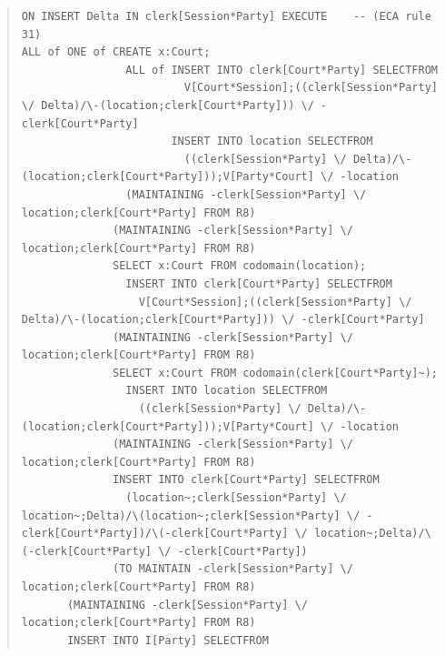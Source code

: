 \documentclass[10pt,a4paper]{report}              %
\theoremstyle{plain}\theorembodyfont{\rmfamily}\newtheorem{definition}{Definition}[section]
\theoremstyle{plain}\theorembodyfont{\rmfamily}\newtheorem{designrule}[definition]{Requirement}
\begin{document}
\begin{quote}
\begin{verbatim}
ON INSERT Delta IN clerk[Session*Party] EXECUTE    -- (ECA rule 31)
ALL of ONE of CREATE x:Court;
                ALL of INSERT INTO clerk[Court*Party] SELECTFROM
                         V[Court*Session];((clerk[Session*Party] \/ Delta)/\-(location;clerk[Court*Party])) \/ -clerk[Court*Party]
                       INSERT INTO location SELECTFROM
                         ((clerk[Session*Party] \/ Delta)/\-(location;clerk[Court*Party]));V[Party*Court] \/ -location
                (MAINTAINING -clerk[Session*Party] \/ location;clerk[Court*Party] FROM R8)
              (MAINTAINING -clerk[Session*Party] \/ location;clerk[Court*Party] FROM R8)
              SELECT x:Court FROM codomain(location);
                INSERT INTO clerk[Court*Party] SELECTFROM
                  V[Court*Session];((clerk[Session*Party] \/ Delta)/\-(location;clerk[Court*Party])) \/ -clerk[Court*Party]
              (MAINTAINING -clerk[Session*Party] \/ location;clerk[Court*Party] FROM R8)
              SELECT x:Court FROM codomain(clerk[Court*Party]~);
                INSERT INTO location SELECTFROM
                  ((clerk[Session*Party] \/ Delta)/\-(location;clerk[Court*Party]));V[Party*Court] \/ -location
              (MAINTAINING -clerk[Session*Party] \/ location;clerk[Court*Party] FROM R8)
              INSERT INTO clerk[Court*Party] SELECTFROM
                (location~;clerk[Session*Party] \/ location~;Delta)/\(location~;clerk[Session*Party] \/ -clerk[Court*Party])/\(-clerk[Court*Party] \/ location~;Delta)/\(-clerk[Court*Party] \/ -clerk[Court*Party])
              (TO MAINTAIN -clerk[Session*Party] \/ location;clerk[Court*Party] FROM R8)
       (MAINTAINING -clerk[Session*Party] \/ location;clerk[Court*Party] FROM R8)
       INSERT INTO I[Party] SELECTFROM

\end{verbatim}
\end{quote}
\end{document}
